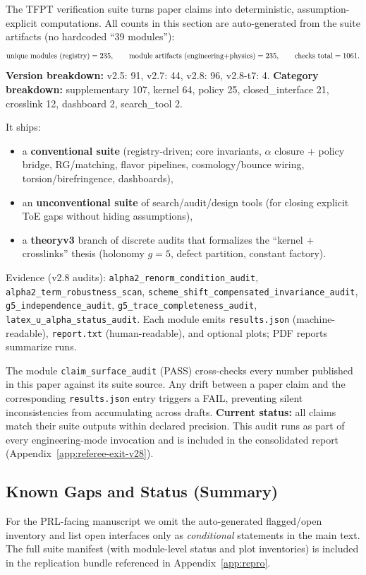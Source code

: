 The TFPT verification suite turns paper claims into deterministic, assumption-explicit computations. All counts in this section are auto-generated from the suite artifacts (no hardcoded ``39 modules''):
\[
\text{unique modules (registry)}=235,\qquad
\text{module artifacts (engineering+physics)}=235,\qquad
\text{checks total}=1061.
\]
\noindent\textbf{Version breakdown:} v2.5: 91, v2.7: 44, v2.8: 96, v2.8-t7: 4.\newline
\textbf{Category breakdown:} supplementary 107, kernel 64, policy 25, closed\_interface 21, crosslink 12, dashboard 2, search\_tool 2.

\medskip\noindent
It ships:
\begin{itemize}[leftmargin=1.5em, topsep=2pt, itemsep=1pt]
    \item a \textbf{conventional suite} (registry-driven; core invariants, $\alpha$ closure + policy bridge, RG/matching, flavor pipelines, cosmology/bounce wiring, torsion/birefringence, dashboards),
    \item an \textbf{unconventional suite} of search/audit/design tools (for closing explicit ToE gaps without hiding assumptions),
    \item a \textbf{theoryv3} branch of discrete audits that formalizes the ``kernel + crosslinks'' thesis (holonomy $g=5$, defect partition, constant factory).
\end{itemize}
Evidence (v2.8 audits): \texttt{alpha2\_renorm\_condition\_audit}, \texttt{alpha2\_term\_robustness\_scan}, \texttt{scheme\_shift\_compensated\_invariance\_audit}, \texttt{g5\_independence\_audit}, \texttt{g5\_trace\_completeness\_audit}, \texttt{latex\_u\_alpha\_status\_audit}.
Each module emits \texttt{results.json} (machine-readable), \texttt{report.txt} (human-readable), and optional plots; PDF reports summarize runs.

\begin{tcolorbox}[colback=blue!3, colframe=blue!40,
    title={\textbf{Claim surface audit (meta-guarantee)}}, fonttitle=\bfseries\small]
The module \texttt{claim\_surface\_audit} (PASS) cross-checks every number published in this
paper against its suite source. Any drift between a paper claim and the corresponding
\texttt{results.json} entry triggers a FAIL, preventing silent inconsistencies from
accumulating across drafts.
\textbf{Current status:} all claims match their suite outputs within declared precision.
This audit runs as part of every engineering-mode invocation and is included in the
consolidated report (Appendix~\ref{app:referee-exit-v28}).
\end{tcolorbox}

\subsection{Known Gaps and Status (Summary)}
\label{sec:known-gaps}
For the PRL-facing manuscript we omit the auto-generated flagged/open inventory and list
open interfaces only as \emph{conditional} statements in the main text. The full
suite manifest (with module-level status and plot inventories) is included in the
replication bundle referenced in Appendix~\ref{app:repro}.

